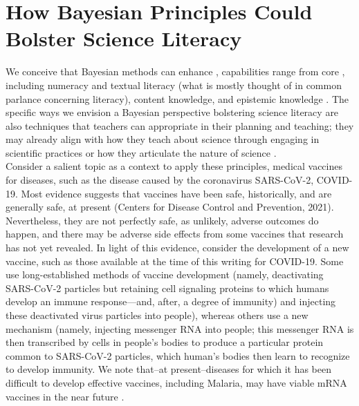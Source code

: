 
\section{How Bayesian Principles Could Bolster Science Literacy}

We conceive that Bayesian methods can enhance , capabilities range from core , including numeracy and textual literacy (what is mostly thought of in common parlance concerning literacy), content knowledge, and epistemic knowledge \parencite{council2016science}. The specific ways we envision a Bayesian perspective bolstering science literacy are also techniques that teachers can appropriate in their planning and teaching; they may already align with how they teach about science through engaging in scientific practices \parencite{nrc12} or how they articulate the nature of science \parencite{lederman2020avoiding}. \\

Consider a salient topic as a context to apply these principles, medical vaccines for diseases, such as the disease caused by the coronavirus SARS-CoV-2, COVID-19. Most evidence suggests that vaccines have been safe, historically, and are generally safe, at present (Centers for Disease Control and Prevention, 2021). Nevertheless, they are not perfectly safe, as unlikely, adverse outcomes do happen, and there may be adverse side effects from some vaccines that research has not yet revealed. In light of this evidence, consider the development of a new vaccine, such as those available at the time of this writing for COVID-19. Some use long-established methods of vaccine development (namely, deactivating SARS-CoV-2 particles but retaining cell signaling proteins to which humans develop an immune response—and, after, a degree of immunity) and injecting these deactivated virus particles into people), whereas others use a new mechanism (namely, injecting messenger RNA into people; this messenger RNA is then transcribed by cells in people’s bodies to produce a particular protein common to SARS-CoV-2 particles, which human’s bodies then learn to recognize to develop immunity. We note that--at present--diseases for which it has been difficult to develop effective vaccines, including Malaria, may have viable mRNA vaccines in the near future \parencite{datoo2021high}. \\

